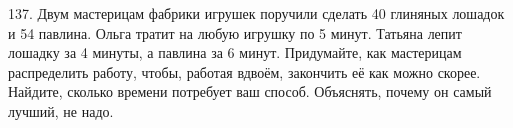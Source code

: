 137. Двум мастерицам фабрики игрушек поручили сделать 40 глиняных лошадок и 54 павлина. Ольга тратит на любую игрушку по 5 минут. Татьяна лепит лошадку за 4 минуты, а павлина за 6 минут. Придумайте, как мастерицам распределить работу, чтобы, работая вдвоём, закончить её как можно скорее. Найдите, сколько времени потребует ваш способ. Объяснять, почему он самый лучший, не надо.\\
